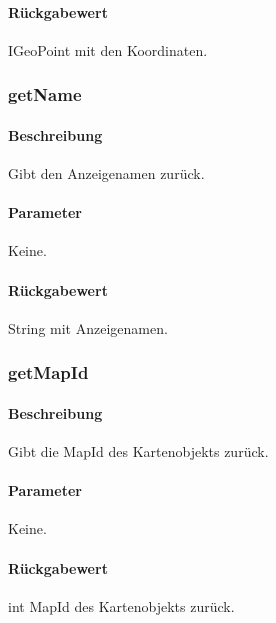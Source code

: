 \paragraph*{Rückgabewert}
IGeoPoint mit den Koordinaten.

\subsubsection{getName}%
\paragraph*{Beschreibung}
Gibt den Anzeigenamen zurück.
\paragraph*{Parameter}
Keine.
\paragraph*{Rückgabewert}
String mit Anzeigenamen.

\subsubsection{getMapId}%
\paragraph*{Beschreibung}
Gibt die MapId des Kartenobjekts zurück.
\paragraph*{Parameter}
Keine.
\paragraph*{Rückgabewert}
int MapId des Kartenobjekts zurück.
